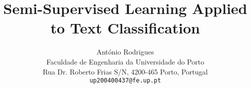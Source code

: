 \documentclass[10pt,twocolumn,letterpaper]{article}
\begin{document}
\title{Semi-Supervised Learning Applied to Text Classification}

\author{António Rodrigues\\
Faculdade de Engenharia da Universidade do Porto\\
Rua Dr. Roberto Frias S\slash N, 4200-465 Porto, Portugal\\
{\tt\small up200400437@fe.up.pt}
}

\maketitle



















{\small


}

\newpage
\rule{0pt}{1pt}\newpage
\rule{0pt}{1pt}\newpage
\rule{0pt}{1pt}\newpage
\rule{0pt}{1pt}\newpage
\rule{0pt}{1pt}\newpage
\rule{0pt}{1pt}\newpage
\rule{0pt}{1pt}\newpage
\rule{0pt}{1pt}\newpage
\end{document}
